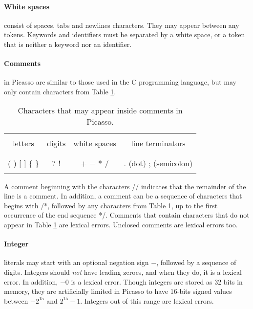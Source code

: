 \documentclass{article}
\begin{document}
\paragraph{White spaces} consist of spaces, tabs and newlines characters.
They may appear between any tokens.
Keywords and identifiers must be separated by a white space,
or a token that is neither a keyword nor an identifier.
\paragraph{Comments} in Picasso are similar to those used in the C programming language,
but may only contain characters from Table \ref{Table_Characters_That _May_Appear_inside_Comments}.
\begin{table}[h]
\centering
\begin{tabular}{ | c | c | c | c | }
\hline
        &        &              &                  \\
letters & digits & white spaces & line terminators \\
        &        &              &                  \\
\hline
                  &     &                 &                       \\
( ) [ ] $\{$ $\}$ & ? ! & $+$ $-$ $*$ $/$ & . (dot) ; (semicolon) \\
                  &     &                 &                       \\
\hline
\end{tabular}
\caption{
Characters that may appear inside comments in Picasso.
\label{Table_Characters_That _May_Appear_inside_Comments}}
\end{table}
A comment beginning with the characters // indicates that the remainder of the line is a comment.
In addition, a comment can be a sequence of characters that begins with /*,
followed by any characters from Table \ref{Table_Characters_That _May_Appear_inside_Comments},
up to the first occurrence of the end sequence */.
Comments that contain characters that do not appear in Table
\ref{Table_Characters_That _May_Appear_inside_Comments} are lexical errors.
Unclosed comments are lexical errors too.
\paragraph{Integer} literals may start with an optional negation sign $-$,
followed by a sequence of digits.
Integers should \textit{not} have leading zeroes,
and when they do, it is a lexical error.
In addition, $-0$ is a lexical error.
Though integers are stored as 32 bits in memory,
they are artificially limited in Picasso to have
16-bits signed values between $-2^{15}$ and $2^{15}-1$.
Integers out of this range are lexical errors.
\end{document}
